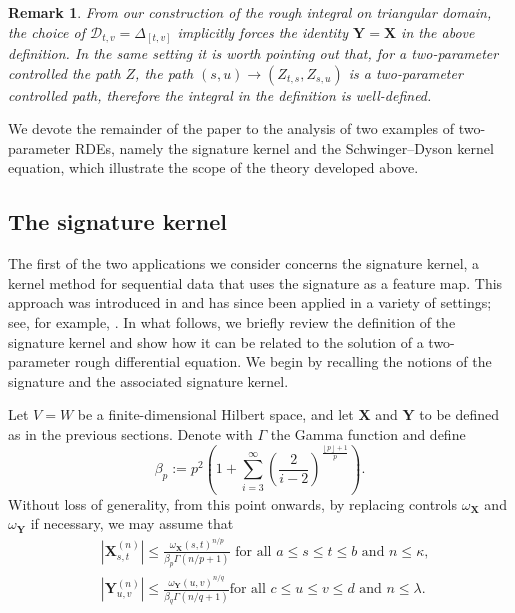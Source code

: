 \documentclass{article}%
\newtheorem{remark}[theorem]{Remark}
\newcommand{\floor}[1]{\left \lfloor {#1}\right \rfloor}
\begin{document}
\begin{remark}
    From our construction of the rough integral on triangular domain, the choice of $\mathcal{D}_{t,v} = \Delta_{[t,v]}$  implicitly forces the identity $\mathbf{Y} = \mathbf{X}$ in the above definition. In the same setting it is worth pointing out that, for a two-parameter controlled  the path $Z$,  the path $(s,u) \to (Z_{t,s}, Z_{s,u})$ is  a two-parameter controlled path, therefore the integral in the definition is well-defined.
\end{remark}

We devote the remainder of the paper to the analysis of two examples of two-parameter RDEs, namely the signature kernel and the Schwinger–Dyson kernel equation, which illustrate the scope of the theory developed above.
\subsection{The signature kernel}
The first of the two applications we consider concerns the signature kernel, a kernel method for sequential data that uses the signature as a feature map. This approach was introduced in \cite{salvi2021signature} and has since been applied in a variety of settings; see, for example, \cite{lemercier2021distribution, toth2020bayesian, alden2025signature}.
In what follows, we briefly review the definition of the signature kernel and show how it can be related to the solution of a two-parameter rough differential equation.
We begin by recalling the notions of the signature and the associated signature kernel.
\newline 

Let $V=W$ be a finite-dimensional Hilbert space, and let $\mathbf{X}$ and $ \mathbf{Y} $ to be defined as in the previous sections.
Denote with $\Gamma$ the Gamma function and define
\[
\beta_p
:=
p^2\!\left(1+\sum_{i=3}^\infty
\left(\frac{2}{i-2}\right)^{\frac{\floor{p}+1}{p}}\right).
\]
Without loss of generality, from this point onwards, by replacing controls $\omega_{\mathbf{X}}$ and $ \omega_{\mathbf{Y}}$ if necessary, we may assume that 
\begin{align*}
&\left|\mathbf{X}^{(n)}_{s,t}\right| \leq \frac{\omega_{\mathbf{X}}(s,t)^{n/p}}{\beta_p \Gamma(n/p + 1)} \text{ for all } a \le s \le t \le b\text{ and } n \leq \kappa, \\
&\left|\mathbf{Y}^{(n)}_{u,v}\right| \leq \frac{\omega_{\mathbf{Y}}(u,v)^{n/q}}{\beta_q \Gamma(n/q + 1)} \text{for all } c \le u \le v \le d \text{ and } n \le \lambda.\\
\end{align*}
\end{document}
